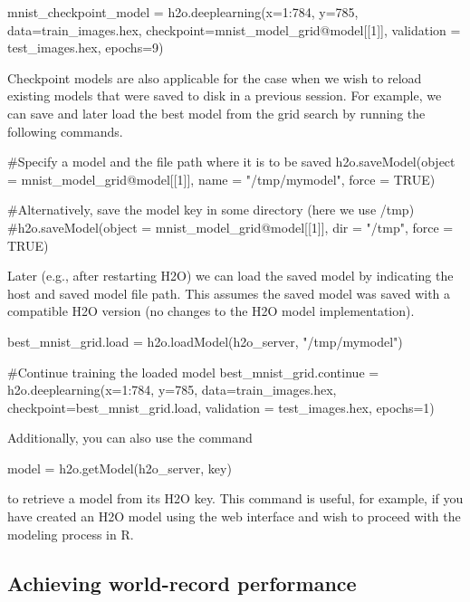 \documentclass[11pt]{article}
\begin{document}
\begin{spverbatim}
mnist_checkpoint_model = h2o.deeplearning(x=1:784, y=785, data=train_images.hex, checkpoint=mnist_model_grid@model[[1]], validation = test_images.hex, epochs=9)

\end{spverbatim}
\noindent
Checkpoint models are also applicable for the case when we wish to reload existing models that were saved to disk in a previous session. For example, we can save and later load the best model from the grid search by running the following commands.

\begin{spverbatim}
#Specify a model and the file path where it is to be saved
h2o.saveModel(object = mnist_model_grid@model[[1]], name = "/tmp/mymodel", force = TRUE)

#Alternatively, save the model key in some directory (here we use /tmp)
#h2o.saveModel(object = mnist_model_grid@model[[1]], dir = "/tmp", force = TRUE)

\end{spverbatim}
\noindent
Later (e.g., after restarting  H2O) we can load the saved model by indicating the host and saved model file path. This assumes the saved model was saved with a compatible H2O version (no changes to the H2O model implementation).

\begin{spverbatim}
best_mnist_grid.load = h2o.loadModel(h2o_server, "/tmp/mymodel")

#Continue training the loaded model
best_mnist_grid.continue = h2o.deeplearning(x=1:784, y=785, data=train_images.hex, checkpoint=best_mnist_grid.load, validation = test_images.hex, epochs=1)

\end{spverbatim}
\noindent
Additionally, you can also use the command
\begin{spverbatim}
model = h2o.getModel(h2o_server, key)

\end{spverbatim}
\noindent
to retrieve a model from its H2O key. This command is useful, for example, if you have created an H2O model using the web interface and wish to proceed with the modeling process in R.

\subsection{Achieving world-record performance} \label{3.6}
\end{document}
